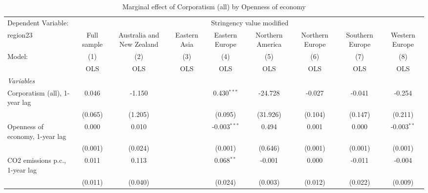 
\begin{table}[htbp]
   \caption{Marginal effect of Corporatism (all) by Openness of economy}
   \centering
   \begin{tabular}{lcccccccc}
      \toprule
      Dependent Variable: & \multicolumn{8}{c}{Stringency value modified}\\
      region23                                                        & Full sample   & Australia and New Zealand & Eastern Asia & Eastern Europe & Northern America & Northern Europe & Southern Europe & Western Europe \\   
      Model:                                                          & (1)           & (2)                       & (3)          & (4)            & (5)              & (6)             & (7)             & (8)\\  
                                                                      &  OLS          & OLS                       & OLS          & OLS            & OLS              & OLS             & OLS             & OLS\\  
      \midrule
      \emph{Variables}\\
      Corporatism (all), 1-year lag                                   & 0.046         & -1.150                    &              & 0.430$^{***}$  & -24.728          & -0.027          & -0.041          & -0.254\\   
                                                                      & (0.065)       & (1.205)                   &              & (0.095)        & (31.926)         & (0.104)         & (0.147)         & (0.211)\\   
      Openness of economy, 1-year lag                                 & 0.000         & 0.010                     &              & -0.003$^{***}$ & 0.494            & 0.001           & 0.000           & -0.003$^{**}$\\   
                                                                      & (0.001)       & (0.024)                   &              & (0.001)        & (0.646)          & (0.001)         & (0.001)         & (0.001)\\   
      CO2 emissions p.c., 1-year lag                                  & 0.011         & 0.113                     &              & 0.068$^{**}$   & -0.001           & 0.000           & -0.011          & -0.004\\   
                                                                      & (0.011)       & (0.040)                   &              & (0.024)        & (0.003)          & (0.012)         & (0.022)         & (0.009)\\   

\end{tabular}
\end{table}
